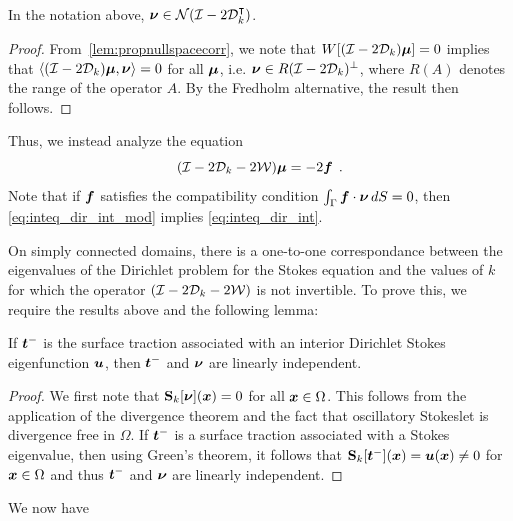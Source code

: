 \begin{lem}
  \label{lem:nunull} In the notation above,
  ${\boldsymbol \nu} \in {\mathcal N}(\mathcal I - 2{\mathcal D}_{k}^{\intercal})$.
\end{lem}
\begin{proof}
From~\cref{lem:propnullspacecorr}, we note that
$W[(\mathcal I - 2{\mathcal D}_{k}){\boldsymbol \mu}] =0$ implies that
$\left<(\mathcal I -2{\mathcal D}_{k}){\boldsymbol \mu} ,{\boldsymbol \nu} \right> = 0$ for
all ${\boldsymbol \mu}$, i.e. ${\boldsymbol \nu} \in R(\mathcal I - 2{\mathcal D}_{k})^{\perp}$, where
$R(A)$ denotes the range of the operator $A$. 
By the Fredholm alternative, the result then follows.
\end{proof}
Thus, we instead analyze the equation
\begin{equation}
(\mathcal I - 2{\mathcal D}_{k}  -2{\mathcal W}) {\boldsymbol \mu} = -2{\boldsymbol f} \; \, . \label{eq:inteq_dir_int_mod}
\end{equation}
Note that if ${\boldsymbol f}$ satisfies the compatibility
condition $\int_\Gamma {\boldsymbol f} \cdot {\boldsymbol \nu} \, dS =0$, then
\cref{eq:inteq_dir_int_mod} implies \cref{eq:inteq_dir_int}.

On simply connected domains, there is a one-to-one correspondance between
the eigenvalues of the Dirichlet problem for
the Stokes equation
and the values of $k$ for which the operator $(\mathcal I - 2{\mathcal D}_{k} - 2{\mathcal W})$
is not invertible. To prove this, we require the results
above and the following lemma:
\begin{lem}
  \label{lem:nutracli}
  If ${\boldsymbol t}^{-}$ is the surface traction associated
  with an interior Dirichlet Stokes eigenfunction ${\boldsymbol u}$,
  then ${\boldsymbol t}^{-}$ and ${\boldsymbol \nu}$ are linearly independent.
\end{lem}
\begin{proof}
We first note that ${\bf S}_{k}[{\boldsymbol \nu}]({\boldsymbol x}) = 0$ for all ${\boldsymbol x} \in \Omega$.
This follows from the application of the divergence theorem and the fact that
oscillatory Stokeslet is divergence free in $\Omega$. 
If ${\boldsymbol t}^{-}$ is a surface traction associated with a Stokes eigenvalue, then
using Green's theorem, it follows that
${\bf S}_{k}[{\boldsymbol t}^{-}]({\boldsymbol x}) = {\boldsymbol u}({\boldsymbol x}) \neq 0$ for ${\boldsymbol x} \in \Omega$ and
thus ${\boldsymbol t}^{-}$ and ${\boldsymbol \nu}$ are linearly independent.
\end{proof}

We now have

